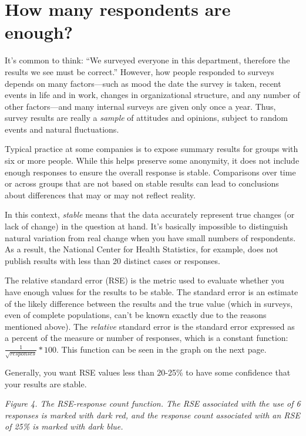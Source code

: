 \documentclass[]{book}
\begin{document}
\section{How many respondents are
enough?}\label{how-many-respondents-are-enough}

It's common to think: ``We surveyed everyone in this department,
therefore the results we see must be correct.'' However, how people
responded to surveys depends on many factors---such as mood the date the
survey is taken, recent events in life and in work, changes in
organizational structure, and any number of other factors---and many
internal surveys are given only once a year. Thus, survey results are
really a \emph{sample} of attitudes and opinions, subject to random
events and natural fluctuations.

Typical practice at some companies is to expose summary results for
groups with six or more people. While this helps preserve some
anonymity, it does not include enough responses to ensure the overall
response is stable. Comparisons over time or across groups that are not
based on stable results can lead to conclusions about differences that
may or may not reflect reality.

In this context, \emph{stable} means that the data accurately represent
true changes (or lack of change) in the question at hand. It's basically
impossible to distinguish natural variation from real change when you
have small numbers of respondents. As a result, the National Center for
Health Statistics, for example, does not publish results with less than
20 distinct cases or responses.

The relative standard error (RSE) is the metric used to evaluate whether
you have enough values for the results to be stable. The standard error
is an estimate of the likely difference between the results and the true
value (which in surveys, even of complete populations, can't be known
exactly due to the reasons mentioned above). The \emph{relative}
standard error is the standard error expressed as a percent of the
measure or number of responses, which is a constant function:
\(\frac{1}{\sqrt{responses}} * 100\). This function can be seen in the
graph on the next page.

Generally, you want RSE values less than 20-25\% to have some confidence
that your results are stable.

\emph{Figure 4. The RSE-response count function. The RSE associated with
the use of 6 responses is marked with dark red, and the response count
associated with an RSE of 25\% is marked with dark blue.}
\end{document}
